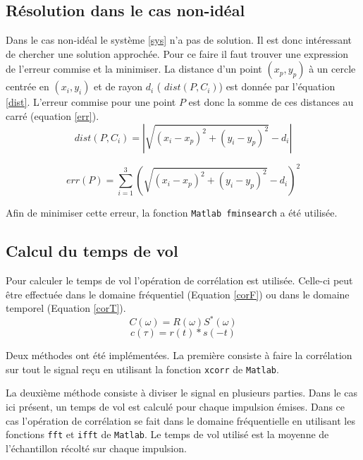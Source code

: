 \documentclass[10pt,a4paper]{article}
\begin{document}
		\subsection{Résolution dans le cas non-idéal}
			Dans le cas non-idéal le système \ref{sys} n'a pas de solution. Il est donc intéressant de chercher une solution approchée. Pour ce faire il faut trouver une expression de l'erreur commise et la minimiser. La distance d'un point $(x_p , y_p)$ à un cercle centrée en $(x_i , y_i)$ et de rayon $d_i$ ( $dist(P , C_i)$) est donnée par l'équation \ref{dist}. L'erreur commise pour une point $P$ est donc la somme de ces distances au carré (equation \ref{err}). 
			\begin{equation}
				dist(P , C_i)= |{\sqrt{(x_i-x_p)^2 +(y_i - y_p)^2} - d_i}| 
				\label{dist}
			\end{equation} 
			
			\begin{equation}
				\label{err}
				err(P) = \sum _{i=1} ^{3} (\sqrt{(x_i-x_p)^2 +(y_i - y_p)^2} - d_i)^2
			\end{equation}
			
			Afin de minimiser cette erreur, la fonction \texttt{Matlab fminsearch} a été utilisée. 
		\subsection{Calcul du temps de vol}
			
			Pour calculer le temps de vol l'opération de corrélation est utilisée. Celle-ci peut être effectuée dans le domaine fréquentiel (Equation \ref{corF}) ou dans le domaine temporel (Equation \ref{corT}). 
			\begin{equation}
				\label{corF}
				C(\omega) = R(\omega)S^*(\omega)
			\end{equation}
			\begin{equation}
				\label{corT}
				c(\tau) = r(t)*s(-t)
			\end{equation}
			
			Deux méthodes ont été implémentées. La première consiste à faire la corrélation sur tout le signal reçu en utilisant la fonction \texttt{xcorr} de \texttt{Matlab}.
			
			 
			La deuxième méthode consiste à diviser le signal en plusieurs parties. Dans le cas ici présent, un temps de vol est calculé pour chaque impulsion émises. Dans ce cas l'opération de corrélation se fait dans le domaine fréquentielle en utilisant les fonctions \texttt{fft} et \texttt{ifft} de \texttt{Matlab}. Le temps de vol utilisé est la moyenne de l'échantillon récolté sur chaque impulsion.
			
\end{document}
